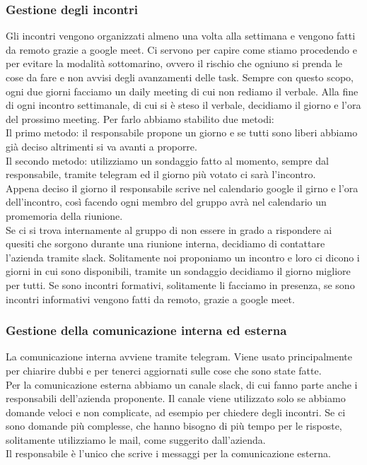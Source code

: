 \documentclass{article}
\begin{document}
\subsubsection{Gestione degli incontri}
Gli incontri vengono organizzati almeno una volta alla settimana e vengono fatti da remoto grazie a google meet. Ci servono per capire come stiamo procedendo e per evitare la modalità sottomarino, ovvero il rischio che ogniuno si prenda le cose da fare e non avvisi degli avanzamenti delle task. Sempre con questo scopo, ogni due giorni facciamo un daily meeting di cui non rediamo il verbale. Alla fine di ogni incontro settimanale, di cui si è steso il verbale, decidiamo il giorno e l'ora del prossimo meeting. Per farlo abbiamo stabilito due metodi: \\
Il primo metodo: il responsabile propone un giorno e se tutti sono liberi abbiamo già deciso altrimenti si va avanti a proporre.\\
Il secondo metodo: utilizziamo un sondaggio fatto al momento, sempre dal responsabile, tramite telegram ed il giorno più votato ci sarà l'incontro. \\
Appena deciso il giorno il responsabile scrive nel calendario google il girno e l'ora dell'incontro, così facendo ogni membro del gruppo avrà nel calendario un promemoria della riunione.\\
Se ci si trova internamente al gruppo di non essere in grado a rispondere ai quesiti che sorgono durante una riunione interna, decidiamo di contattare l'azienda tramite slack. Solitamente noi proponiamo un incontro e loro ci dicono i giorni in cui sono disponibili, tramite un sondaggio decidiamo il giorno migliore per tutti. Se sono incontri formativi, solitamente li facciamo in presenza, se sono incontri informativi vengono fatti da remoto, grazie a google meet. 


\subsubsection{Gestione della comunicazione interna ed esterna}
La comunicazione interna avviene tramite telegram. Viene usato principalmente per chiarire dubbi e per tenerci aggiornati sulle cose che sono state fatte.\\
Per la comunicazione esterna abbiamo un canale slack, di cui fanno parte anche i responsabili dell'azienda proponente. Il canale viene utilizzato solo se abbiamo domande veloci e non complicate, ad esempio per chiedere degli incontri. Se ci sono domande più complesse, che hanno bisogno di più tempo per le risposte, solitamente utilizziamo le mail, come suggerito dall'azienda.\\
Il responsabile è l'unico che scrive i messaggi per la comunicazione esterna. 
\end{document}
